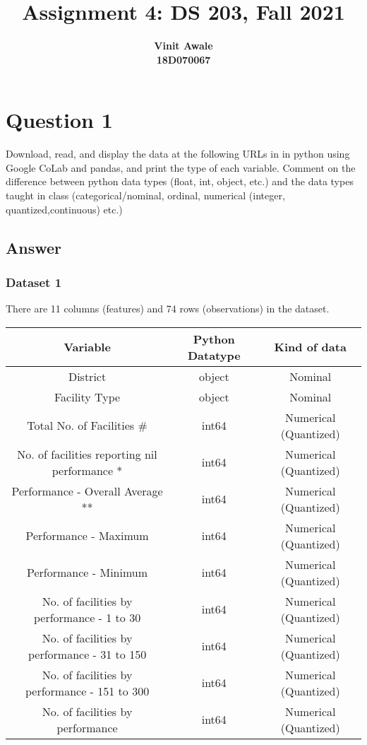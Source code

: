 \documentclass[12pt]{article}
\title{Assignment 4: DS 203, Fall 2021}
\author{\textbf{Vinit Awale} \\
        \textbf{18D070067}}
\date{}
\begin{document}
\maketitle

\section*{Question 1}
Download, read, and display the data at the following URLs in in python using Google CoLab and pandas, and print the type of each variable. Comment on the difference between python data types (float, int, object, etc.) and the data types taught in class (categorical/nominal, ordinal, numerical (integer, quantized,continuous) etc.)
\subsection*{Answer}
\subsubsection*{Dataset 1}
There are 11 columns (features) and 74 rows (observations) in the dataset.
\begin{center}
    \begin{tabular}{ |c|c|c| } 
    \hline
    Variable & Python Datatype & Kind of data \\
    \hline
    District                                        & object & Nominal\\
    Facility Type                                   & object & Nominal\\
    Total No. of Facilities #                       & int64  & Numerical (Quantized) \\
    No. of facilities reporting nil performance *   & int64  & Numerical (Quantized) \\
    Performance - Overall Average **                & int64  & Numerical (Quantized) \\
    Performance - Maximum                           &  int64 & Numerical (Quantized) \\
    Performance - Minimum                           &  int64 & Numerical (Quantized) \\
    No. of facilities by performance - 1 to 30      &  int64 & Numerical (Quantized) \\
    No. of facilities by performance - 31 to 150    &  int64 & Numerical (Quantized) \\
    No. of facilities by performance - 151 to 300   &  int64 & Numerical (Quantized)\\
    No. of facilities by performance \geq 300       &  int64 & Numerical (Quantized) \\
    \hline
    \end{tabular}
\end{center}
\end{document}
